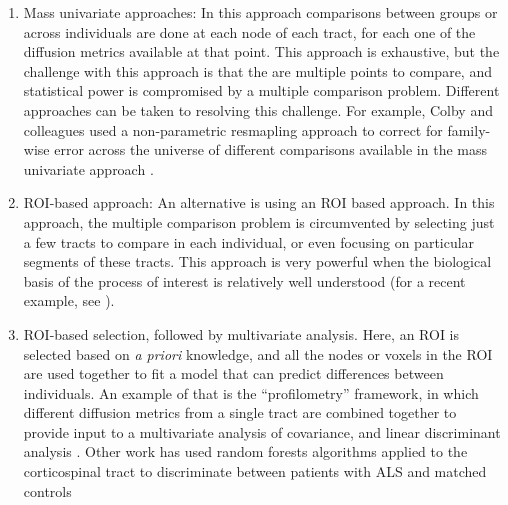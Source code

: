 \begin{enumerate}

\item Mass univariate approaches: In this approach comparisons between groups or
across individuals are done at each node of each tract, for each one of the
diffusion metrics available at that point. This approach is exhaustive, but the
challenge with this approach is that the are multiple points to compare, and
statistical power is compromised by a multiple comparison problem. Different
approaches can be taken to resolving this challenge. For example, Colby and
colleagues \cite{colby2012} used a non-parametric resmapling approach to correct
for family-wise error across the universe of different comparisons available in
the mass univariate approach \cite{Nichols2002-zu, Nichols2003-yy}.

\item ROI-based approach: An alternative is using an ROI based approach. In this
approach, the multiple comparison problem is circumvented by selecting just a
few tracts to compare in each individual, or even focusing on particular
segments of these tracts. This approach is very powerful when the biological
basis of the process of interest is relatively well understood (for a recent
example, see \cite{huber2018rapid}).

\item ROI-based selection, followed by multivariate analysis. Here, an ROI is
selected based on \emph{a priori} knowledge, and all the nodes or voxels in the
ROI are used together to fit a model that can predict differences between
individuals. An example of that is the ``profilometry'' framework, in which
different diffusion metrics from a single tract are combined together to provide
input to a multivariate analysis of covariance, and linear discriminant analysis
\cite{dayan2016profilometry}. Other work has used random forests algorithms
applied to the corticospinal tract to discriminate between patients with ALS and
matched controls \cite{sarica2017corticospinal}

\end{enumerate}


